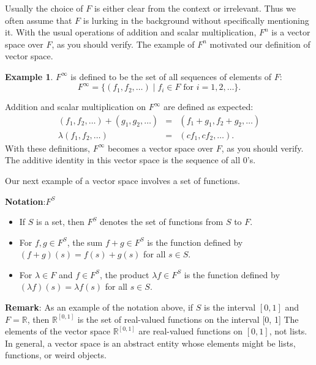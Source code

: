 \documentclass[
]{book}
\providecommand{\tightlist}{%
  \setlength{\itemsep}{0pt}\setlength{\parskip}{0pt}}
\theoremstyle{definition}
\theoremstyle{definition}
\newtheorem{example}{Example}[chapter]
\theoremstyle{definition}
\theoremstyle{definition}
\theoremstyle{remark}
\begin{document}
Usually the choice of \(F\) is either clear from the context or irrelevant. Thus we often assume that \(F\) is lurking in the background without specifically mentioning it. With the usual operations of addition and scalar multiplication, \(F^n\) is a vector space over \(F\), as you should verify. The example of \(F^n\) motivated our definition of vector space.

\begin{example}
\protect\hypertarget{exm:unnamed-chunk-19}{}\label{exm:unnamed-chunk-19}\(F^\infty\) is defined to be the set of all sequences of elements of \(F\):
\[F^\infty = \{(f_1, f_2, \ldots) \mid f_i \in F \text{ for } i = 1, 2, \ldots\}.\]

Addition and scalar multiplication on \(F^\infty\) are defined as expected:
\begin{eqnarray*}
(f_1, f_2, \ldots) + (g_1, g_2, \ldots) &=& (f_1 + g_1, f_2 + g_2, \ldots)\\
\lambda(f_1, f_2, \ldots) &=& (cf_1, cf_2, \ldots).
\end{eqnarray*}
With these definitions, \(F^\infty\) becomes a vector space over \(F\), as you should verify.
The additive identity in this vector space is the sequence of all 0's.
\end{example}

Our next example of a vector space involves a set of functions.

\textbf{Notation}:\(F^S\)

\begin{itemize}
\tightlist
\item
  If \(S\) is a set, then \(F^S\) denotes the set of functions from \(S\) to \(F\).
\item
  For \(f,g \in F^S\), the sum \(f + g \in F^S\) is the function defined by \((f + g)(s) = f(s) + g(s)\) for all \(s \in S\).
\item
  For \(\lambda \in F\) and \(f \in F^S\), the product \(\lambda f \in F^S\) is the function defined by \((\lambda f)(s) = \lambda f(s)\) for all \(s \in S\).
\end{itemize}

\textbf{Remark}: As an example of the notation above, if \(S\) is the interval \([0, 1]\) and \(F=\mathbb{R}\), then \(\mathbb{R}^{[0,1]}\) is the set of real-valued functions on the interval {[}0, 1{]}
The elements of the vector space \(\mathbb{R}^{[0,1]}\)
are real-valued functions on \([0, 1]\), not
lists. In general, a vector space is an
abstract entity whose elements might
be lists, functions, or weird objects.
\end{document}
